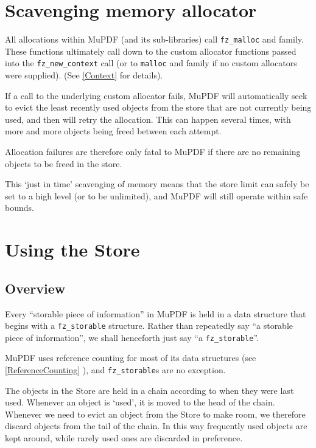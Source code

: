 \documentclass[oneside]{book}
\newcommand{\rjwref}[1] {\autoref{#1} \nameref{#1}}
\begin{document}
\section{Scavenging memory allocator}

All allocations within MuPDF (and its sub-libraries) call \texttt{fz\_malloc} and family. These functions ultimately call down to the custom allocator functions passed into the \texttt{fz\_new\_context} call (or to \texttt{malloc} and family if no custom allocators were supplied). (See \rjwref{Context} for details).

If a call to the underlying custom allocator fails, MuPDF will automatically seek to evict the least recently used objects from the store that are not currently being used, and then will retry the allocation. This can happen several times, with more and more objects being freed between each attempt.

Allocation failures are therefore only fatal to MuPDF if there are no remaining objects to be freed in the store.

This `just in time' scavenging of memory means that the store limit can safely be set to a high level (or to be unlimited), and MuPDF will still operate within safe bounds.


\section{Using the Store}

\subsection{Overview}

Every ``storable piece of information'' in MuPDF is held in a data structure that begins with a \texttt{fz\_storable} structure. Rather than repeatedly say ``a storable piece of information'', we shall henceforth just say ``a \texttt{fz\_storable}''.

MuPDF uses reference counting for most of its data structures (see \rjwref{ReferenceCounting}), and \texttt{fz\_storable}s are no exception.

The objects in the Store are held in a chain according to when they were last used. Whenever an object is `used', it is moved to the head of the chain. Whenever we need to evict an object from the Store to make room, we therefore discard objects from the tail of the chain. In this way frequently used objects are kept around, while rarely used ones are discarded in preference.
\end{document}
